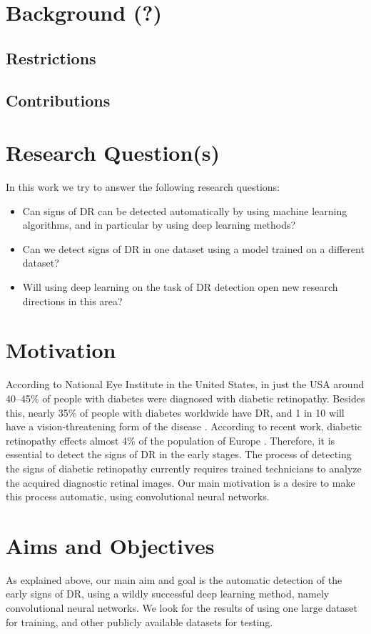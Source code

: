 \section{Background (?)} 

\subsection{Restrictions}
\subsection{Contributions}



\section{Research Question(s)}
In this work we try to answer the following research questions:

\begin{itemize}
    \item Can signs of DR can be detected automatically by using machine learning algorithms, and in particular by using deep learning methods?
    \item Can we detect signs of DR in one dataset using a model trained on a different dataset?
    \item Will using deep learning on the task of DR detection open new research directions in this area? 
\end{itemize}

\section{Motivation}
According to National Eye Institute in the United States, in just the USA around 40--45\% of people with diabetes were diagnosed with diabetic retinopathy. Besides this, nearly 35\% of people with diabetes worldwide have DR, and 1 in 10 will have a vision-threatening form of the disease \citep{yau2012global}. According to recent work, diabetic retinopathy effects almost 4\% of the population of Europe \citep{nentwich2015diabetic}. Therefore, it is essential to detect the signs of DR in the early stages. The process of detecting the signs of diabetic retinopathy currently requires trained technicians to analyze the acquired diagnostic retinal images. Our main motivation is a desire to make this process automatic, using convolutional neural networks.

\section{Aims and Objectives}
As explained above, our main aim and goal is the automatic detection of the early signs of DR, using a wildly successful deep learning method, namely convolutional neural networks. We look for the results of using one large dataset for training, and other publicly available datasets for testing. 

